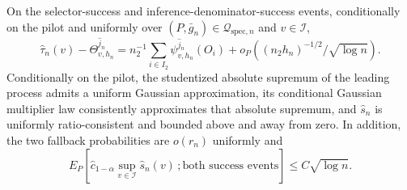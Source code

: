 On the selector-success and inference-denominator-success events, conditionally on the pilot and uniformly over \((P,\bar g_n)\in\mathcal Q_{\mathrm{spec},n}\) and \(v\in\mathcal I\),
\[
 \widehat\tau_n(v)-\Theta^{\widehat j_n}_{v,h_n}
 =n_2^{-1}\sum_{i\in I_2}\psi^{\widehat j_n}_{v,h_n}(O_i)
 +o_P\!\left((n_2h_n)^{-1/2}/\sqrt{\log n}\right).
\]
Conditionally on the pilot, the studentized absolute supremum of the leading process admits a uniform Gaussian approximation, its conditional Gaussian multiplier law consistently approximates that absolute supremum, and \(\widehat s_n\) is uniformly ratio-consistent and bounded above and away from zero.  In addition, the two fallback probabilities are \(o(r_n)\) uniformly and
\[
 E_P\!\left[\widehat c_{1-\alpha}\sup_{v\in\mathcal I}\widehat s_n(v)\,; \text{both success events}\right]\le C\sqrt{\log n}.
\]